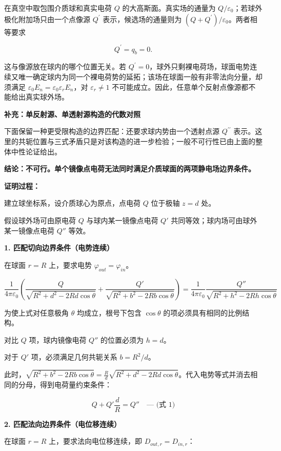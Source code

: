 在真空中取包围介质球和真实电荷 \(Q\) 的大高斯面。真实场的通量为
\(Q/\varepsilon_0\)；若球外极化附加场只由一个点像源 \(Q^{\prime}\)
表示，候选场的通量则为 \((Q+Q^{\prime})/\varepsilon_0\)。两者相等要求

\[
Q^{\prime}=q_b=0.
\]

这与像源放在球内的哪个位置无关。若
\(Q^{\prime}=0\)，球外只剩裸电荷场，球面电势连续又唯一确定球内为同一个裸电荷势的延拓；该场在球面一般有非零法向分量，却须满足
\(\varepsilon_0E_n=\varepsilon_0\varepsilon_rE_n\)，对
\(\varepsilon_r\ne1\)
不可能成立。因此，任意单个反射点像源都不能给出真实球外场。

\textbf{补充：单反射源、单透射源构造的代数对照}

下面保留一种更受限构造的边界匹配：还要求球内势由一个透射点源
\(Q^{\prime\prime}\)
表示。这里的共轭位置与三式矛盾只是对该构造的进一步检验；一般不可行性已由上面的整体中性论证给出。

\textbf{结论：不可行。单个镜像点电荷无法同时满足介质球面的两项静电场边界条件。}

\textbf{证明过程：}

建立球坐标系，设介质球心为原点，点电荷 \(Q\) 位于极轴 \(z=d\) 处。

假设球外场可由原电荷 \(Q\) 与球内某一镜像点电荷 \(Q'\)
共同等效；球内场可由球外某一镜像点电荷 \(Q''\) 等效。

\textbf{1. 匹配切向边界条件（电势连续）}

在球面 \(r=R\) 上，要求电势 \(\varphi_{out} = \varphi_{in}\)。

\[
\frac{1}{4\pi\varepsilon_0} \left( \frac{Q}{\sqrt{R^2+d^2-2Rd\cos\theta}} + \frac{Q'}{\sqrt{R^2+b^2-2Rb\cos\theta}} \right) = \frac{1}{4\pi\varepsilon_0} \frac{Q''}{\sqrt{R^2+h^2-2Rh\cos\theta}}
\]

为使上式对任意极角 \(\theta\) 均成立，根号下包含 \(\cos\theta\)
的项必须具有相同的比例结构。

对比 \(Q\) 项，球内镜像电荷 \(Q''\) 的位置必须为 \(h=d\)。

对于 \(Q'\) 项，必须满足几何共轭关系 \(b = R^2/d\)。

此时，\(\sqrt{R^2+b^2-2Rb\cos\theta} = \frac{R}{d}\sqrt{R^2+d^2-2Rd\cos\theta}\)。代入电势等式并消去相同的分母，得到电荷量约束条件：

\[
Q + Q'\frac{d}{R} = Q'' \quad \text{--- (式 1)}
\]

\textbf{2. 匹配法向边界条件（电位移连续）}

在球面 \(r=R\) 上，要求法向电位移连续，即 \(D_{out, r} = D_{in, r}\)：


